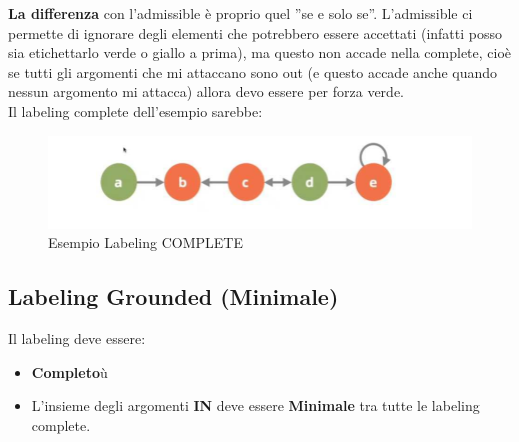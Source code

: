 \textbf{La differenza} con l’admissible è proprio quel ”se e solo se”. L’admissible ci permette di ignorare degli elementi che potrebbero essere accettati (infatti posso sia etichettarlo verde o giallo a prima), ma questo non accade nella complete, cioè se tutti gli argomenti che mi attaccano sono out (e questo
accade anche quando nessun argomento mi attacca) allora devo essere per forza verde. 
\\
Il labeling complete dell’esempio sarebbe:
\begin{figure}[htp]
	\centering
    \includegraphics[width=12cm, keepaspectratio]{img/Cap7/LC2.png}
    \caption{Esempio Labeling COMPLETE}
\end{figure}
\newpage
\subsection{Labeling Grounded (Minimale)}
Il labeling deve essere:
\begin{itemize}
    \item \textbf{Completo}ù
    \item L’insieme degli argomenti \textbf{IN} deve essere \textbf{Minimale} tra tutte le labeling complete.
\end{itemize}
